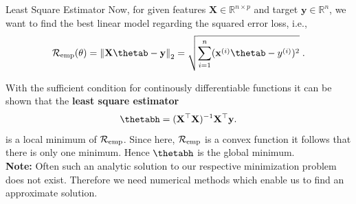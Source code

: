 \documentclass[11pt,compress,t,notes=noshow, xcolor=table]{beamer}
\begin{document}
\begin{vbframe}{Least Square Estimator}
Now, for given features $\mathbf{X} \in \mathbb{R}^{n\times p}$ and target $\mathbf{y} \in \mathbb{R}^n$, we want to find the best linear model regarding the squared error loss, i.e.,
\[\risket = \left\Vert \mathbf{X}\thetab - \mathbf{y}\right\Vert_2 = \sqrt{\sum^n_{i=1} (\mathbf{x}^{(i)}\thetab - y^{(i)})^2}\;.\]

With the sufficient condition for continously differentiable functions it can be shown that the \textbf{least square estimator}
\[\thetabh = (\mathbf{X}^\top\mathbf{X})^{-1}\mathbf{X}^\top\mathbf{y}.\]
is a local minimum of $\mathcal{R}_{\text{emp}}$. Since here, $\mathcal{R}_{\text{emp}}$ is a convex function it follows that there is only one minimum. Hence $\thetabh$ is the global minimum. \\

\lz \textbf{Note:} Often such an analytic solution to our respective minimization problem does not exist. Therefore we need numerical methods which enable us to find an approximate solution.

\end{vbframe}
\end{document}
